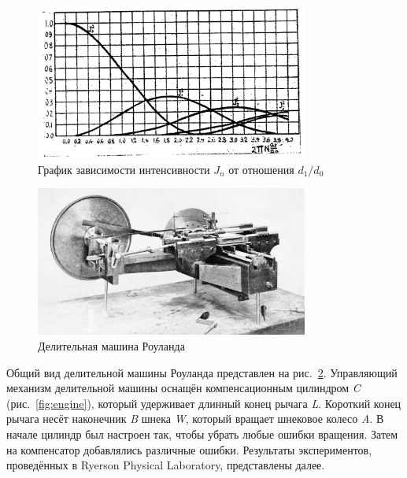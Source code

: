\documentclass[a4paper, 12pt]{article}
\begin{document}
\begin{figure}[h!]
\begin{center}
    \includegraphics[width=0.8\textwidth]{intens.png}
\end{center}
\caption{График зависимости интенсивности $J_n$ от отношения $d_1/d_0$}
\label{fig:intens}
\end{figure}

\begin{figure}[h!]
\begin{center}
    \includegraphics[width=0.8\textwidth]{machine.jpg}
\end{center}
\caption{Делительная машина Роуланда}
\label{fig:machine}
\end{figure}

Общий вид делительной машины Роуланда представлен на рис.~\ref{fig:machine}. Управляющий механизм делительной машины оснащён компенсационным цилиндром \textit{C} (рис.~\ref{fig:engine}), который удерживает длинный конец рычага \textit{L}. Короткий конец рычага несёт наконечник \textit{B} шнека \textit{W}, который вращает шнековое колесо \textit{A}. В начале цилиндр был настроен так, чтобы убрать любые ошибки вращения. Затем на компенсатор добавлялись различные ошибки. Результаты экспериментов, проведённых в Ryerson Physical Laboratory, представлены далее.
\end{document}
